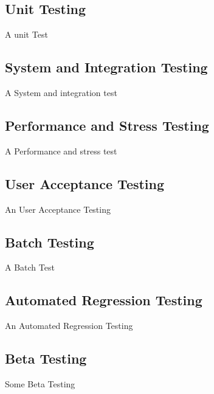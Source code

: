 \subsection{Unit Testing}
A unit Test
\subsection{System and Integration Testing}
A System and integration test
\subsection{Performance and Stress Testing}
A Performance and stress test
\subsection{User Acceptance Testing}
An User Acceptance Testing
\subsection{Batch Testing}
A Batch Test
\subsection{Automated Regression Testing}
An Automated Regression Testing
\subsection{Beta Testing}
Some Beta Testing
